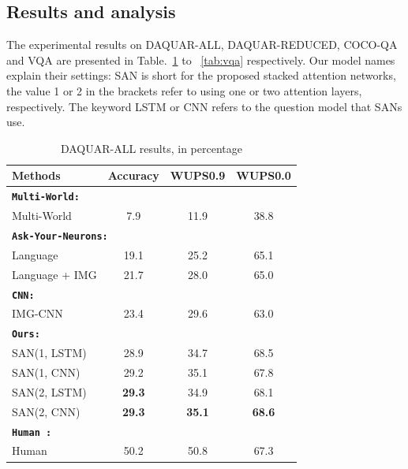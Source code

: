 \documentclass[10pt,twocolumn,letterpaper]{article}
\begin{document}
\subsection{Results and analysis }
The experimental results on DAQUAR-ALL, DAQUAR-REDUCED, COCO-QA and VQA are
presented in Table.~\ref{tab:daquar_all_results} to ~\ref{tab:vqa}
respectively. Our model names explain their settings: SAN is short for the
proposed stacked attention networks, the value 1 or 2 in the brackets refer to
using one or two attention layers, respectively. The keyword LSTM or CNN refers
to the question model that SANs use.

\begin{table}[!thbp]
  \vspace{-0.5cm}
      \centering
  \begin{tabular}{l  c  c  c }
    \toprule
    Methods & Accuracy & WUPS0.9 &  WUPS0.0
    \\
    \midrule
    \multicolumn{4}{l}{
    {\bf \texttt{Multi-World:}} \cite{malinowski2014multi}} \\
    Multi-World & 7.9 & 11.9 & 38.8 \\
    \midrule
    \multicolumn{4}{l}{
    {\bf \texttt{Ask-Your-Neurons:}} \cite{malinowski2015ask}} \\
    Language & 19.1 & 25.2 & 65.1 \\
    Language + IMG & 21.7 & 28.0 & 65.0 \\
    {\bf \texttt{CNN:}} \cite{ma2015learning} \\
    IMG-CNN & 23.4 & 29.6 & 63.0 \\
    \midrule
    {\bf \texttt{Ours:}} \\
    SAN(1, LSTM) & 28.9  & 34.7 & 68.5 \\
    SAN(1, CNN) & 29.2 & 35.1 & 67.8 \\
    SAN(2, LSTM) & {\bf 29.3} & 34.9 & 68.1 \\
    SAN(2, CNN) & {\bf 29.3} & {\bf 35.1} & {\bf 68.6} \\
    \midrule
    {\bf \texttt{Human :}\cite{malinowski2014multi}} \\
    Human & 50.2 & 50.8 & 67.3 \\
    \bottomrule
  \end{tabular}
  \caption{DAQUAR-ALL results, in percentage}
  \label{tab:daquar_all_results}
  \end{table}
\end{document}
